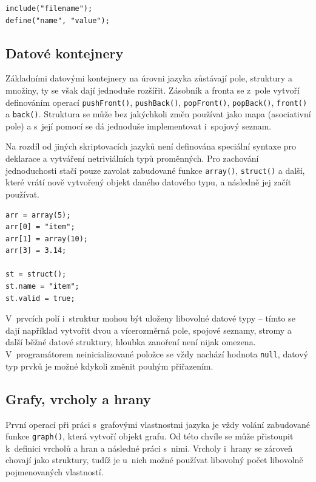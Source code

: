 \documentclass[11pt,twoside,a4paper]{book}
\begin{document}
\begin{verbatim}
include("filename");
define("name", "value");
\end{verbatim}


\subsection{Datové kontejnery}
\label{datove_kontejnery}

Základními datovými kontejnery na úrovni jazyka zůstávají pole, struktury a množiny, ty se však dají jednoduše rozšířit. Zásobník a fronta se z~pole vytvoří definováním operací \texttt{pushFront()}, \texttt{push\-Back()}, \texttt{popFront()}, \texttt{popBack()}, \texttt{front()} a \texttt{back()}. Struktura se může bez jakýchkoli změn po\-u\-ží\-vat jako mapa (asociativní pole) a s~její pomocí se dá jednoduše implementovat i~spojový seznam.

Na rozdíl od jiných skriptovacích jazyků není definována speciální syntaxe pro deklarace a vytváření netriviálních typů proměnných. Pro zachování jednoduchosti stačí pouze zavolat zabudované funkce \texttt{array()}, \texttt{struct()} a další, které vrátí nově vytvořený objekt daného datového typu, a ná\-sled\-ně jej začít používat.

\begin{verbatim}
arr = array(5);
arr[0] = "item";
arr[1] = array(10);
arr[3] = 3.14;

st = struct();
st.name = "item";
st.valid = true;
\end{verbatim}

V~prvcích polí i~struktur mohou být uloženy libovolné datové typy -- tímto se dají například vytvořit dvou a vícerozměrná pole, spojové seznamy, stromy a další běžné datové struktury, hloubka zanoření není nijak omezena. V~programátorem neinicializované položce se vždy nachází hodnota \texttt{null}, datový typ prvků je možné kdykoli změnit pouhým přiřazením.


\subsection{Grafy, vrcholy a hrany}

První operací při práci s~grafovými vlastnostmi jazyka je vždy volání zabudované funkce \texttt{graph()}, která vytvoří objekt grafu. Od této chvíle se může přistoupit k~definici vrcholů a hran a následné práci s~nimi. Vrcholy i~hrany se zároveň chovají jako struktury, tudíž je u~nich možné používat libovolný počet libovolně pojmenovaných vlastností.
\end{document}
